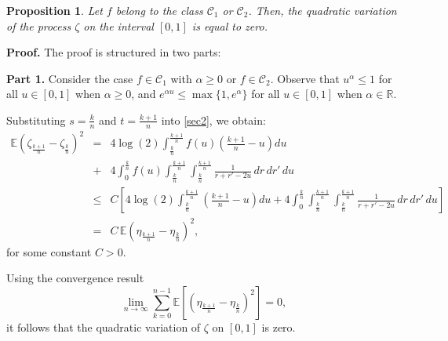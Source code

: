 \documentclass[preprint,12pt,authoryear]{elsarticle}
\def\E{\mathbb{E}}
\newtheorem{prop}{Proposition}
\begin{document}
\begin{prop}\label{propB}
Let \( f \) belong to the class \( \mathcal{C}_1 \) or \( \mathcal{C}_2 \). Then, the quadratic variation of the process \( \zeta \) on the interval \( [0,1] \) is equal to zero.
\end{prop}


\noindent\textbf{Proof.} The proof is structured in two parts:

\noindent\textbf{Part 1.} Consider the case \( f \in \mathcal{C}_1 \) with \( \alpha \geq 0 \) or \( f \in \mathcal{C}_2 \). Observe that \( u^{\alpha} \leq 1 \) for all \( u \in [0,1] \) when \( \alpha \geq 0 \), and \( e^{\alpha u} \leq \max\{1, e^{\alpha}\} \) for all \( u \in [0,1] \) when \( \alpha \in \mathbb{R} \). 

Substituting \( s = \frac{k}{n} \) and \( t = \frac{k+1}{n} \) into \eqref{sec2}, we obtain:
\small
\begin{eqnarray*}
\E\left(\zeta_{\frac{k+1}{n}} - \zeta_{\frac{k}{n}}\right)^2 
&=& 4\log(2) \int_{\frac{k}{n}}^{\frac{k+1}{n}} f(u)\left(\frac{k+1}{n} - u\right) du \\
&+& 4 \int_0^{\frac{k}{n}} f(u) \int_{\frac{k}{n}}^{\frac{k+1}{n}} \int_{\frac{k}{n}}^{\frac{k+1}{n}} \frac{1}{r + r' - 2u} \, dr \, dr' \, du \\
&\leq& C \left[ 4\log(2) \int_{\frac{k}{n}}^{\frac{k+1}{n}} \left(\frac{k+1}{n} - u\right) du + 4 \int_0^{\frac{k}{n}} \int_{\frac{k}{n}}^{\frac{k+1}{n}} \int_{\frac{k}{n}}^{\frac{k+1}{n}} \frac{1}{r + r' - 2u} \, dr \, dr' \, du \right] \\
&=& C \, \E\left(\eta_{\frac{k+1}{n}} - \eta_{\frac{k}{n}}\right)^2,
\end{eqnarray*}
\normalsize
for some constant \( C > 0 \). 

Using the convergence result
\begin{equation}\label{quadratic-variation-eta}
\lim_{n \rightarrow \infty} \sum_{k=0}^{n-1} \E\left[ \left( \eta_{\frac{k+1}{n}} - \eta_{\frac{k}{n}} \right)^2 \right] = 0,
\end{equation}
it follows that the quadratic variation of \( \zeta \) on \([0,1]\) is zero.\\
\end{document}
